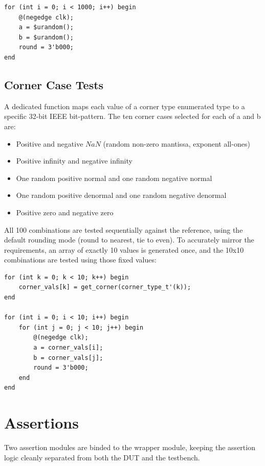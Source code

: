 \documentclass[12pt]{report}
\begin{document}
\hspace{10pt}

\begin{lstlisting}[style=svstyle]
for (int i = 0; i < 1000; i++) begin
    @(negedge clk);
    a = $urandom();
    b = $urandom();
    round = 3'b000;
end
\end{lstlisting}

\subsection{Corner Case Tests}
A dedicated function maps each value of a corner type enumerated type to a specific 32-bit IEEE bit-pattern. The ten corner cases selected for each of a and b are:
\begin{itemize}
\item Positive and negative $NaN$ (random non-zero mantissa, exponent all-ones)
\item Positive infinity and negative infinity
\item One random positive normal and one random negative normal
\item One random positive denormal and one random negative denormal
\item Positive zero and negative zero
\end{itemize}

\noindent All 100 combinations are tested sequentially against the reference, using the default rounding mode (round to nearest, tie to even). To accurately mirror the requirements, an array of exactly 10 values is generated once, and the 10x10 combinations are tested using those fixed values:

\hspace{10pt}

\begin{lstlisting}[style=svstyle]
for (int k = 0; k < 10; k++) begin
    corner_vals[k] = get_corner(corner_type_t'(k));
end

for (int i = 0; i < 10; i++) begin
    for (int j = 0; j < 10; j++) begin
        @(negedge clk);
        a = corner_vals[i];
        b = corner_vals[j];
        round = 3'b000;
    end
end
\end{lstlisting}

\section{Assertions}
Two assertion modules are binded to the wrapper module, keeping the assertion logic cleanly separated from both the DUT and the testbench.
\end{document}
